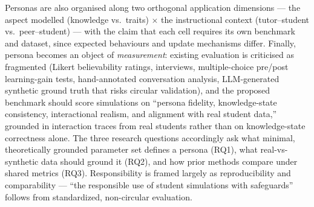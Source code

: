 Personas are also organised along two orthogonal application dimensions --- the aspect modelled (knowledge vs.\ traits)
$\times$ the instructional context (tutor--student vs.\ peer--student) --- with the claim that each cell requires its own
benchmark and dataset, since expected behaviours and update mechanisms differ. Finally, persona becomes an object of
\emph{measurement}: existing evaluation is criticised as fragmented (Likert believability ratings, interviews,
multiple-choice pre/post learning-gain tests, hand-annotated conversation analysis, LLM-generated synthetic ground truth
that risks circular validation), and the proposed benchmark should score simulations on ``persona fidelity,
knowledge-state consistency, interactional realism, and alignment with real student data,'' grounded in interaction
traces from real students rather than on knowledge-state correctness alone. The three research questions accordingly ask
what minimal, theoretically grounded parameter set defines a persona (RQ1), what real-vs-synthetic data should ground it
(RQ2), and how prior methods compare under shared metrics (RQ3). Responsibility is framed largely as
reproducibility and comparability --- ``the responsible use of student simulations with safeguards'' follows from
standardized, non-circular evaluation.


